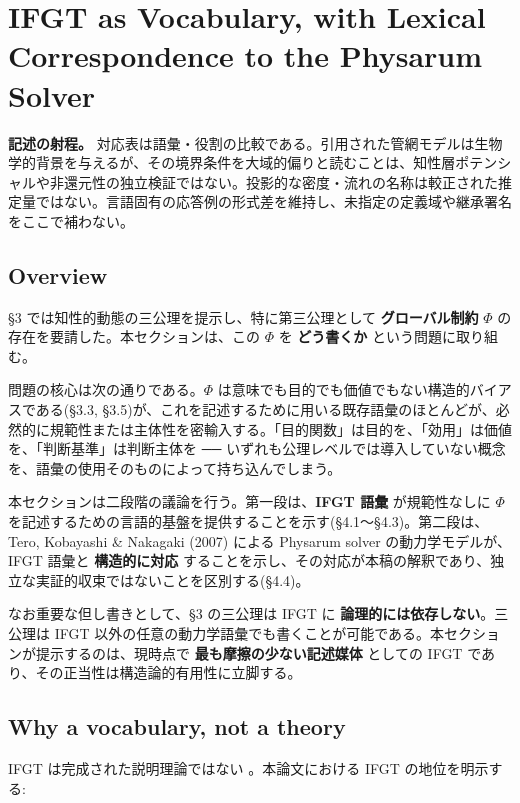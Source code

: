 \section{IFGT as Vocabulary, with Lexical Correspondence to the Physarum Solver}

\noindent\textbf{記述の射程。} 対応表は語彙・役割の比較である。引用された管網モデルは生物学的背景を与えるが、その境界条件を大域的偏りと読むことは、知性層ポテンシャルや非還元性の独立検証ではない。投影的な密度・流れの名称は較正された推定量ではない。言語固有の応答例の形式差を維持し、未指定の定義域や継承署名をここで補わない。



\subsection{Overview}


\S{}3 では知性的動態の三公理を提示し、特に第三公理として \textbf{グローバル制約} $\Phi$ の存在を要請した。本セクションは、この $\Phi$ を \textbf{どう書くか} という問題に取り組む。

問題の核心は次の通りである。$\Phi$ は意味でも目的でも価値でもない構造的バイアスである(\S{}3.3, \S{}3.5)が、これを記述するために用いる既存語彙のほとんどが、必然的に規範性または主体性を密輸入する。「目的関数」は目的を、「効用」は価値を、「判断基準」は判断主体を ── いずれも公理レベルでは導入していない概念を、語彙の使用そのものによって持ち込んでしまう。

本セクションは二段階の議論を行う。第一段は、\textbf{IFGT 語彙} が規範性なしに $\Phi$ を記述するための言語的基盤を提供することを示す(\S{}4.1〜\S{}4.3)。第二段は、Tero, Kobayashi \& Nakagaki (2007) による Physarum solver の動力学モデルが、IFGT 語彙と \textbf{構造的に対応} することを示し、その対応が本稿の解釈であり、独立な実証的収束ではないことを区別する(\S{}4.4)。

なお重要な但し書きとして、\S{}3 の三公理は IFGT に \textbf{論理的には依存しない}。三公理は IFGT 以外の任意の動力学語彙でも書くことが可能である。本セクションが提示するのは、現時点で \textbf{最も摩擦の少ない記述媒体} としての IFGT であり、その正当性は構造論的有用性に立脚する。

\subsection{Why a vocabulary, not a theory}


IFGT は完成された説明理論ではない \citep{IFGT}。本論文における IFGT の地位を明示する:

